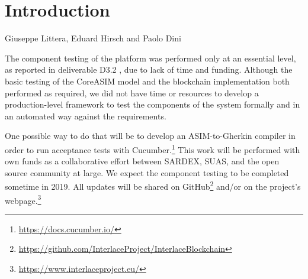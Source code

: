 \chapter{Introduction}
\label{ch:Introduction}

\vspace{-1cm}
\begin{center}
Giuseppe Littera, Eduard Hirsch and Paolo Dini
\end{center}

The component testing of the platform was performed only at an essential level, as reported in deliverable D3.2 \cite{INTERLACE_D32}, due to lack of time and funding. Although the basic testing of the CoreASIM model and the blockchain implementation both performed as required, we did not have time or resources to develop a production-level framework to test the components of the system formally and in an automated way against the requirements.

One possible way to do that will be to develop an ASIM-to-Gherkin compiler in order to run acceptance tests with Cucumber.\footnote{\url{https://docs.cucumber.io/}}  This work will be performed with own funds as a collaborative effort between SARDEX, SUAS, and the open source community at large. We expect the component testing to be completed sometime in 2019. All updates will be shared on GitHub\footnote{\url{https://github.com/InterlaceProject/InterlaceBlockchain}} and/or on the project's webpage.\footnote{\url{https://www.interlaceproject.eu/}} 

\newpage
